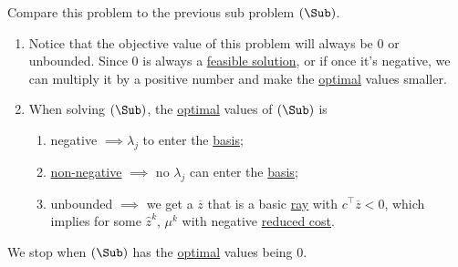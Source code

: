 \begin{prev}
\begin{enumerate}[(a)]
		      \begin{remark}
			      Compare this problem to the previous sub problem \((\Sub)\).
			      \begin{enumerate}
				      \item Notice that the objective value of this problem will always be \(0\) or unbounded. Since \(0\) is always a \hyperref[def:feasible-solution]{feasible solution}, or if once it's negative, we can multiply it by a positive number and make the \hyperref[def:optimal-solution]{optimal} values smaller.
				      \item When solving \((\Sub)\), the \hyperref[def:optimal-solution]{optimal} values of \((\Sub)\) is
				            \begin{enumerate}
					            \item negative \(\implies \lambda_{j}\) to enter the \hyperref[def:basis]{basis};
					            \item \underline{non-negative} \(\implies\) no \(\lambda_{j}\) can enter the \hyperref[def:basis]{basis};
					            \item unbounded \(\implies\) we get a \(\overline{z}\) that is a basic \hyperref[def:ray]{ray} with \(c^{\top}\overline{z} <0\), which implies for
					                  some \(\hat{z}^k\), \(\mu^k\) with negative \hyperref[def:reduced-cost]{reduced cost}.
				            \end{enumerate}
			      \end{enumerate}
			      \begin{note}
				      We stop when \((\Sub)\) has the \hyperref[def:optimal-solution]{optimal} values being \(0\).
			      \end{note}
		      \end{remark}
	\end{enumerate}
\end{prev}

